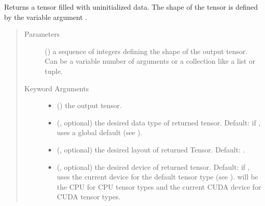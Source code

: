\documentclass[letterpaper,10pt,english,openany,oneside]{sphinxmanual}
\begin{document}
\begin{fulllineitems}
\label{\detokenize{nn:nn.linear.empty}}
Returns a tensor filled with uninitialized data. The shape of the tensor is
defined by the variable argument .
\begin{quote}\begin{description}
\item[{Parameters}] \leavevmode
{} () \textendash{} a sequence of integers defining the shape of the output tensor.
Can be a variable number of arguments or a collection like a list or tuple.

\item[{Keyword Arguments}] \leavevmode\begin{itemize}
\item {} 
 (\sphinxstyleliteralemphasis{\sphinxupquote{, }}) \textendash{} the output tensor.

\item {} 
 (, optional) \textendash{} the desired data type of returned tensor.
Default: if , uses a global default (see ).

\item {} 
 (, optional) \textendash{} the desired layout of returned Tensor.
Default: .

\item {} 
 (, optional) \textendash{} the desired device of returned tensor.
Default: if , uses the current device for the default tensor type
(see ).  will be the CPU
for CPU tensor types and the current CUDA device for CUDA tensor types.


\end{itemize}
\end{description}
\end{quote}
\end{fulllineitems}
\end{document}
